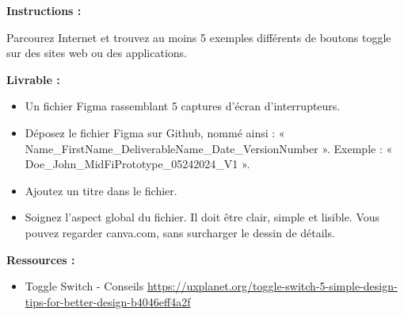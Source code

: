 \makeheaderfiles

\textbf{Instructions :}

Parcourez Internet et trouvez au moins 5 exemples différents de boutons toggle sur des sites web ou des applications.

\textbf{Livrable :}

\begin{itemize}
\item Un fichier Figma rassemblant 5 captures d'écran d'interrupteurs.
\item Déposez le fichier Figma sur Github, nommé ainsi : « Name\_FirstName\_DeliverableName\_Date\_VersionNumber ». Exemple : « Doe\_John\_MidFiPrototype\_05242024\_V1 ».
\item Ajoutez un titre dans le fichier.
\item Soignez l'aspect global du fichier. Il doit être clair, simple et lisible. Vous pouvez regarder canva.com, sans surcharger le dessin de détails.
\end{itemize}

\textbf{Ressources :}

\begin{itemize}
\item Toggle Switch - Conseils \url{https://uxplanet.org/toggle-switch-5-simple-design-tips-for-better-design-b4046eff4a2f}
\end{itemize}

